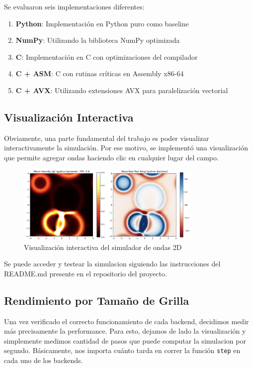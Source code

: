\documentclass[a4paper]{article}
\begin{document}
Se evaluaron seis implementaciones diferentes:
\begin{enumerate}
    \item \textbf{Python}: Implementación en Python puro como baseline
    \item \textbf{NumPy}: Utilizando la biblioteca NumPy optimizada
    \item \textbf{C}: Implementación en C con optimizaciones del compilador
    \item \textbf{C + ASM}: C con rutinas críticas en Assembly x86-64
    \item \textbf{C + AVX}: Utilizando extensiones AVX para paralelización vectorial
\end{enumerate}

\subsection{Visualización Interactiva}
Obviamente, una parte fundamental del trabajo es poder visualizar interactivamente la simulación. Por ese motivo, se implementó una visualización que permite agregar ondas haciendo clic en cualquier lugar del campo.

\begin{figure}[h]
    \centering
    \includegraphics[width=0.8\textwidth]{extra/live_visualization.png}
    \caption{Visualización interactiva del simulador de ondas 2D}
    \label{fig:live_visualization}
\end{figure}

Se puede acceder y testear la simulacion siguiendo las instrucciones del README.md presente en el repositorio del proyecto.

\subsection{Rendimiento por Tamaño de Grilla}
Una vez verificado el correcto funcionamiento de cada backend, decidimos medir más precisamente la performance. Para esto, dejamos de lado la visualización y simplemente medimos cantidad de pasos que puede computar la simulacion por segundo. Básicamente, nos importa cuánto tarda en correr la función \texttt{step} en cada uno de los backends.
\end{document}
